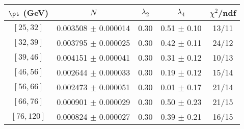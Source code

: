 \begin{tabular}{c||c|c|c|c}
$\pt$ (GeV) & $N$ & $\lambda_{2}$ & $\lambda_4$  & $\chi^2$/ndf  \\
\hline
$[25, 32]$ & 0.003508 $\pm$ 0.000014 & 0.30 & 0.51 $\pm$ 0.10 & 13/11\\
$[32, 39]$ & 0.003795 $\pm$ 0.000025 & 0.30 & 0.42 $\pm$ 0.11 & 24/12\\
$[39, 46]$ & 0.004151 $\pm$ 0.000041 & 0.30 & 0.31 $\pm$ 0.12 & 10/13\\
$[46, 56]$ & 0.002644 $\pm$ 0.000033 & 0.30 & 0.19 $\pm$ 0.12 & 15/14\\
$[56, 66]$ & 0.002473 $\pm$ 0.000051 & 0.30 & 0.01 $\pm$ 0.17 & 21/14\\
$[66, 76]$ & 0.000901 $\pm$ 0.000029 & 0.30 & 0.50 $\pm$ 0.23 & 21/15\\
$[76, 120]$ & 0.000824 $\pm$ 0.000027 & 0.30 & 0.39 $\pm$ 0.21 & 16/15\\
\end{tabular}
